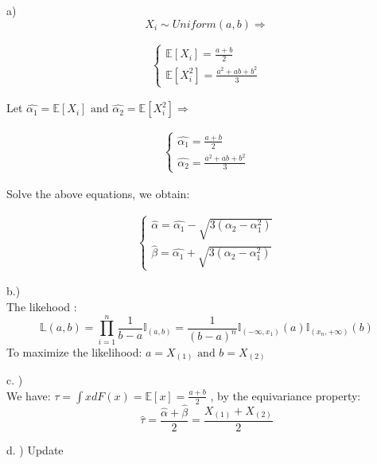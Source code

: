 \documentclass[10pt]{article}
\newenvironment{problem}[2][Problem]{\begin{trivlist}
\item[\hskip \labelsep {\bfseries #1}\hskip \labelsep {\bfseries #2.}]}{\end{trivlist}}
\begin{document}
\begin{problem}{2} 

a) \\

\[X_i \sim Uniform(a, b) \Rightarrow\]

\begin{align}
    \begin{cases}
        \mathbb{E}[X_i]= \frac{a+b}{2} \\
        \mathbb{E}[X_i ^2]= \frac{a^2 + ab+ b^2}{3}
    \end{cases}
\end{align}

Let $\hat{\alpha_1} =\mathbb{E}[X_i] \text{ and } \hat{\alpha_2} =\mathbb{E}[X_i ^2 ] \Rightarrow$

\begin{align}
    \begin{cases}
        \hat{\alpha_1}= \frac{a+b}{2} \\
        \hat{\alpha_2}= \frac{a^2 + ab+ b^2}{3}
    \end{cases}
\end{align}

Solve the above equations, we obtain:

\begin{align}
    \begin{cases}
        \hat{\alpha}= \hat{\alpha_1} - \sqrt{3(\alpha_2 -\alpha_1 ^2)} \\
        \hat{\beta}= \hat{\alpha_1} + \sqrt{3(\alpha_2 -\alpha_1 ^2)}
    \end{cases}
\end{align}



b.) \\

The likehood :
\[\mathbb{L}(a,b)=\prod_{i=1}^n \frac{1}{b-a} \mathbb{I}_{(a,b)}= \frac{1}{(b-a)^n} \mathbb{I}_{(-\infty, x_{1})}(a)\mathbb{I}_{(x_{n},+\infty)}(b) \]
To maximize the likelihood: $a=X_{(1)} \text{ and } b=X_{(2)}$



c. ) \\

We have: $\tau=\int xdF(x)= \mathbb{E}[x]= \frac{a+b}{2}$ , by the equivariance property:
\[\hat{\tau}= \frac{\hat{\alpha}+\hat{\beta}}{2}=\frac{X_{(1)}+X_{(2)}}{2}\]


d. ) Update


\end{problem}
\end{document}
